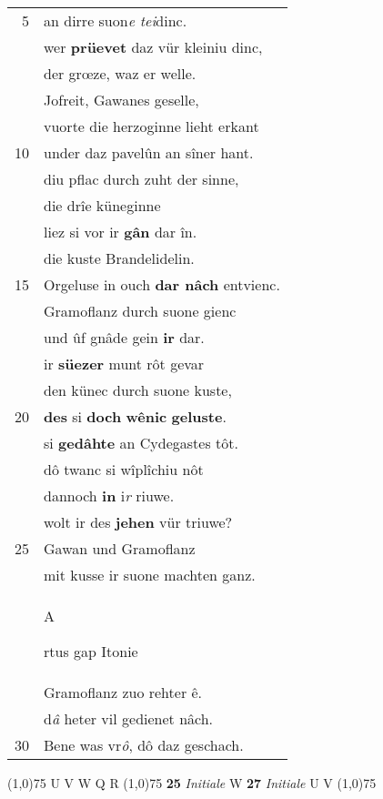 \documentclass[8pt,a4paper,notitlepage]{article}
\begin{document}
\begin{table}[ht]
\begin{minipage}[t]{0.5\linewidth}
\begin{tabular}{rl}
5 & an dirre suon\textit{e tei}dinc.\\ 
 & wer \textbf{prüevet} daz vür kleiniu dinc,\\ 
 & der grœze, waz er welle.\\ 
 & Jofreit, Gawanes geselle,\\ 
 & vuorte die herzoginne lieht erkant\\ 
10 & under daz pavelûn an sîner hant.\\ 
 & diu pflac durch zuht der sinne,\\ 
 & die drîe küneginne\\ 
 & liez si vor ir \textbf{gân} dar în.\\ 
 & die kuste Brandelidelin.\\ 
15 & Orgeluse in ouch \textbf{dar nâch} entvienc.\\ 
 & Gramoflanz durch suone gienc\\ 
 & und ûf gnâde gein \textbf{ir} dar.\\ 
 & ir \textbf{süezer} munt rôt gevar\\ 
 & den künec durch suone kuste,\\ 
20 & \textbf{des} si \textbf{doch} \textbf{wênic} \textbf{geluste}.\\ 
 & si \textbf{gedâhte} an Cydegastes tôt.\\ 
 & dô twanc si wîplîchiu nôt\\ 
 & dannoch \textbf{in} i\textit{r} riuwe.\\ 
 & wolt ir des \textbf{jehen} vür triuwe?\\ 
25 & Gawan und Gramoflanz\\ 
 & mit kusse ir suone machten ganz.\\ 
 & \begin{large}A\end{large}rtus gap Itonie\\ 
 & Gramoflanz zuo rehter ê.\\ 
 & d\textit{â} heter vil gedienet nâch.\\ 
30 & Bene was vr\textit{ô}, dô daz geschach.\\ 
\end{tabular}
\scriptsize
\line(1,0){75} \newline
U V W Q R \newline
\line(1,0){75} \newline
\textbf{25} \textit{Initiale} W  \textbf{27} \textit{Initiale} U V  \newline
\line(1,0){75} \newline

\end{minipage}
\end{table}
\end{document}
